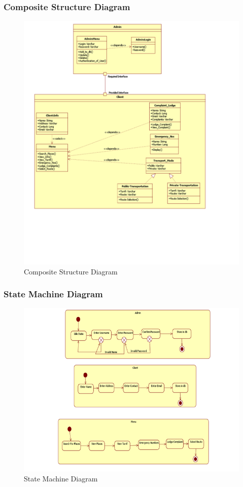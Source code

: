 \documentclass[12pt,a4paper]{article}
\begin{document}
{{{{{{\subsubsection{Composite Structure Diagram}
\begin{figure}[!htb]
\centering
\includegraphics[width=15 cm]{composite}
\caption{Composite Structure Diagram}
\end{figure}
\newpage
\subsubsection{State Machine Diagram}
\begin{figure}[!htb]
\centering
\includegraphics[width=15 cm]{state}
\caption{State Machine Diagram}
\end{figure}
\newpage
}}}}}}
\end{document}

